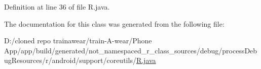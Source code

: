 Definition at line 36 of file R.\+java.



The documentation for this class was generated from the following file\+:\begin{DoxyCompactItemize}
\item 
D\+:/cloned repo trainawear/train-\/\+A-\/wear/\+Phone App/app/build/generated/not\+\_\+namespaced\+\_\+r\+\_\+class\+\_\+sources/debug/process\+Debug\+Resources/r/android/support/coreutils/\mbox{\hyperlink{process_debug_resources_2r_2android_2support_2coreutils_2_r_8java}{R.\+java}}\end{DoxyCompactItemize}
